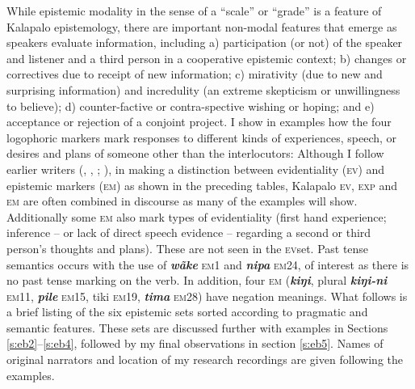 \documentclass[output=paper]{langsci/langscibook}
\begin{document}
While epistemic modality in the sense of a “scale” or “grade” is a feature of Kalapalo epistemology, there are important non-modal features that emerge as speakers evaluate information, including a) participation (or not)  of the speaker and listener and a third person in a cooperative epistemic context; b) changes or correctives due to receipt of new information; c) mirativity (due to new and surprising information) and incredulity (an extreme skepticism or unwillingness to believe); d) counter-factive or contra-spective wishing or hoping; and e) acceptance or rejection of a conjoint project.  I show in examples how the four logophoric markers mark responses to different kinds of experiences, speech, or desires and plans of someone other than the interlocutors:  
Although I follow earlier writers (\citealt{Aikhenvald2004}, \citealt{Haan1999}, \citeyear{Haan2001}; \citealt{NuckollsLev2012}), in making a distinction between evidentiality (\textsc{ev}) and epistemic markers (\textsc{em}) as shown in the preceding tables, Kalapalo \textsc{ev}, \textsc{exp} and \textsc{em} are often combined in discourse as many of the examples will show. Additionally some \textsc{em} also mark types of evidentiality (first hand experience; inference -- or lack of direct speech evidence -- regarding a second or third person’s thoughts and plans). These are not seen in the \textsc{ev}set.  Past tense semantics occurs with the use of \textbf{\textit{wãke}} \textsc{em1} and \textbf{\textit{nipa}} \textsc{em}24, of interest as there is no past tense marking on the verb.  In addition, four \textsc{em}  (\textbf{\textit{kiŋi}}, plural \textbf{\textit{kiŋi-ni}} \textsc{em}11, \textbf{\textit{pile}} \textsc{em}15, tiki \textsc{em}19,  \textbf{\textit{tima}} \textsc{em}28)  have negation meanings.  What follows is a brief listing of the six epistemic sets sorted according to pragmatic and semantic features. These sets are discussed further with examples in Sections \ref{s:eb2}--\ref{s:eb4}, followed by my final observations in section \ref{s:eb5}.  Names of original narrators and location of my research recordings are given following the examples.	
	
\end{document}
